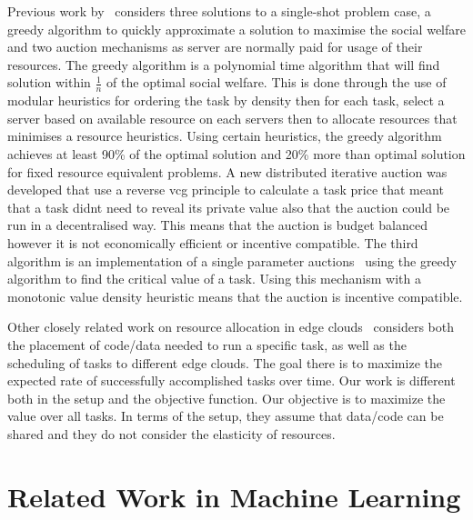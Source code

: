 Previous work by~\cite{FlexibleResourceAllocation} considers three solutions to a single-shot problem case,
a greedy algorithm to quickly approximate a solution to maximise the social welfare and two auction mechanisms as server
are normally paid for usage of their resources. The greedy algorithm is a polynomial time algorithm that will find solution
within $\frac{1}{n}$ of the optimal social welfare.
This is done through the use of modular heuristics for ordering the task by density then for each task, select a server
based on available resource on each servers then to allocate resources that minimises a resource heuristics.
Using certain heuristics, the greedy algorithm achieves at least 90\% of the optimal solution and 20\% more than optimal
solution for fixed resource equivalent problems. A new distributed iterative auction was developed that use a reverse vcg
principle to calculate a task price that meant that a task didnt need to reveal its private value also that the
auction could be run in a decentralised way. This means that the auction is budget balanced however it is not
economically efficient or incentive compatible. The third algorithm is an implementation of a single parameter
auctions~\citep{nisan2007algorithmic_critical_value} using the greedy algorithm to find the critical value of a task.
Using this mechanism with a monotonic value density heuristic means that the auction is incentive compatible.

Other closely related work on resource allocation in edge clouds~\cite{vaji_infocom} considers both the placement of
code/data needed to run a specific task, as well as the scheduling of tasks to different edge clouds. The goal there
is to maximize the expected rate of successfully accomplished tasks over time. Our work is different both in the setup
and the objective function. Our objective is to maximize the value over all tasks. In terms of the setup, they assume
that data/code can be shared and they do not consider the elasticity of resources.
\section{Related Work in Machine Learning}\label{sec:related-work-in-machine-learning}